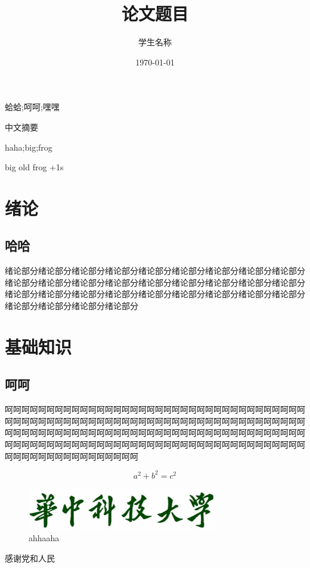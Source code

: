 \documentclass{HGPMac}
\title{论文题目}
\author{学生名称}
\date{\today}
\begin{document}
\maketitle

\makestatement

\begin{cnabstract}{蛤蛤;呵呵;嘿嘿}

中文摘要

\end{cnabstract}

\begin{enabstract}{haha;big;frog}

big old frog +1s

\end{enabstract}



\tableofcontents
\clearpage 


\section{绪论}

\subsection{哈哈}
绪论部分绪论部分绪论部分绪论部分绪论部分绪论部分绪论部分绪论部分绪论部分绪论部分绪论部分绪论部分绪论部分绪论部分绪论部分绪论部分绪论部分绪论部分绪论部分绪论部分绪论部分绪论部分绪论部分绪论部分绪论部分绪论部分绪论部分绪论部分绪论部分绪论部分绪论部分\cite{Lv1997}

\clearpage

\section{基础知识}

\subsection{呵呵}

呵呵呵呵呵呵呵呵呵呵呵呵呵呵呵呵呵呵呵呵呵呵呵呵呵呵呵呵呵呵呵呵呵呵呵呵呵呵呵呵呵呵呵呵呵呵呵呵呵呵呵呵呵呵呵呵呵呵呵呵呵呵呵呵呵呵呵呵呵呵呵呵呵呵呵呵呵呵呵呵呵呵呵呵呵呵呵呵呵呵呵呵呵呵呵呵呵呵呵呵呵呵呵呵呵呵呵呵呵呵呵呵呵呵呵呵呵呵呵呵呵呵呵呵呵呵呵呵呵呵呵呵呵呵呵呵呵呵呵呵呵呵呵呵呵呵呵呵呵呵呵呵呵呵呵呵呵呵呵呵

\begin{equation}
a^2 + b^2 =c^2
\end{equation}


\begin{figure}[bhtp]
\centering
\includegraphics{school.bmp}
\caption{ahhaaha}
\label{school}
\end{figure}

\begin{thankpage}

感谢党和人民

\end{thankpage}



\end{document}
